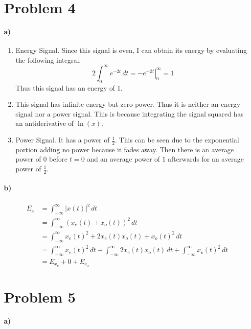 \documentclass[12pt]{article}
\begin{document}
\section*{Problem 4}

\paragraph{a)}

\begin{enumerate}
    \item Energy Signal. Since this signal is even, I can obtain its energy by evaluating the following integral.
    \[2\int_0^\infty e^{-2t}\,dt=\left.-e^{-2t}\right|_0^\infty=1\]
    Thus this signal has an energy of 1.
    \item This signal has infinite energy but zero power. Thus it is neither an energy signal nor a power signal. This is because integrating the
    signal squared has an antiderivative of \(\ln(x)\).
    \item Power Signal. It has a power of \(\frac{1}{2}\). This can be seen due to the exponential portion adding no power because it fades away. Then
    there is an average power of \(0\) before \(t=0\) and an average power of \(1\) afterwards for an average power of \(\frac{1}{2}\).
\end{enumerate}

\paragraph{b)}

\begin{align*}
    E_x&=\int_{-\infty}^\infty \left|x(t)\right|^2\,dt\\
    &=\int_{-\infty}^\infty \left(x_e(t)+x_o(t)\right)^2\,dt\\
    &=\int_{-\infty}^\infty x_e(t)^2+2x_e(t)x_o(t)+x_o(t)^2\,dt\\
    &=\int_{-\infty}^\infty x_e(t)^2\,dt + \int_{-\infty}^\infty 2x_e(t)x_o(t)\,dt + \int_{-\infty}^\infty x_o(t)^2\,dt\\
    &=E_{x_e}+0+E_{x_o}
\end{align*}

\pagebreak

\section*{Problem 5}

\paragraph{a)}
\end{document}
